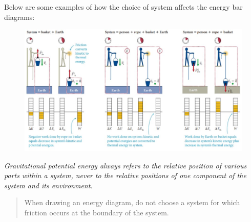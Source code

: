         Below are some examples of how the choice of system affects the energy bar diagrams:

        \begin{figure}[hbt!]
            \centering
            \includegraphics[]{Resources/System_work}
        \end{figure}

        \textit{Gravitational potential energy always refers to the relative position of various parts within a system, never to the relative positions of one component of the system and its environment.} \\

        \color{blue}
        \begin{quote}
            When drawing an energy diagram, do not choose a system for which friction occurs at the boundary of the system.
        \end{quote}
        \color{black}
